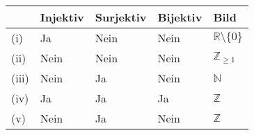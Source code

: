 \documentclass[a4paper, 11pt]{article}
\begin{document}
\begin{table}[h!]
    \begin{tabular}{@{}l | l | l | l | l}
        
        & Injektiv & Surjektiv & Bijektiv & Bild\\ [0ex]
        \hline
        (i) & Ja & Nein & Nein & $\mathbb{R} \setminus \{0\}$ \\
        (ii) & Nein & Nein & Nein & $\mathbb{Z}_ {\geq 1}$ \\
        (iii) & Nein & Ja & Nein & $\mathbb{N}$ \\
        (iv) & Ja & Ja & Ja & $\mathbb{Z}$ \\
        (v) & Nein & Ja & Nein & $\mathbb{Z}$ \\
        \hline
    \end{tabular}
    \label{tab:my_label}
\end{table}
\end{document}
